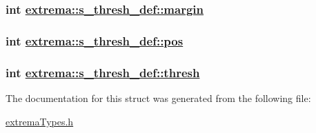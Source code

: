 \hypertarget{structextrema_1_1s__thresh__def_3e5fd583aab99f1dc00c0fea91cab97c}{
\subsubsection[margin]{\setlength{\rightskip}{0pt plus 5cm}int \hyperlink{structextrema_1_1s__thresh__def_3e5fd583aab99f1dc00c0fea91cab97c}{extrema::s\_\-thresh\_\-def::margin}}}
\label{structextrema_1_1s__thresh__def_3e5fd583aab99f1dc00c0fea91cab97c}


\hypertarget{structextrema_1_1s__thresh__def_37e7b91ca56bddb77fdb699d21abdb72}{
\subsubsection[pos]{\setlength{\rightskip}{0pt plus 5cm}int \hyperlink{structextrema_1_1s__thresh__def_37e7b91ca56bddb77fdb699d21abdb72}{extrema::s\_\-thresh\_\-def::pos}}}
\label{structextrema_1_1s__thresh__def_37e7b91ca56bddb77fdb699d21abdb72}


\hypertarget{structextrema_1_1s__thresh__def_8535832da11ff18be5275c3734e924ed}{
\subsubsection[thresh]{\setlength{\rightskip}{0pt plus 5cm}int \hyperlink{structextrema_1_1s__thresh__def_8535832da11ff18be5275c3734e924ed}{extrema::s\_\-thresh\_\-def::thresh}}}
\label{structextrema_1_1s__thresh__def_8535832da11ff18be5275c3734e924ed}




The documentation for this struct was generated from the following file:\begin{CompactItemize}
\item 
\hyperlink{extremaTypes_8h}{extrema\-Types.h}\end{CompactItemize}
